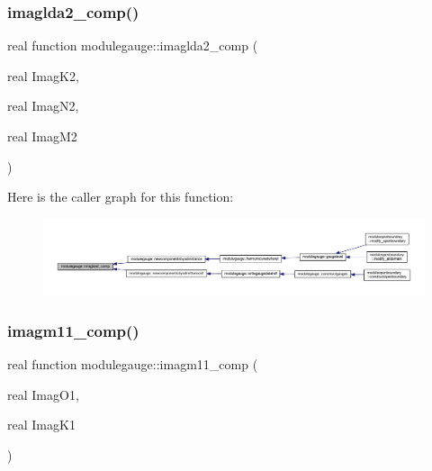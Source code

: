 \subsubsection{\texorpdfstring{imaglda2\+\_\+comp()}{imaglda2\_comp()}}
{\footnotesize\ttfamily real function modulegauge\+::imaglda2\+\_\+comp (\begin{DoxyParamCaption}\item[{real}]{Imag\+K2,  }\item[{real}]{Imag\+N2,  }\item[{real}]{Imag\+M2 }\end{DoxyParamCaption})\hspace{0.3cm}{\ttfamily [private]}}

Here is the caller graph for this function\+:\nopagebreak
\begin{figure}[H]
\begin{center}
\leavevmode
\includegraphics[width=350pt]{namespacemodulegauge_a0f06a83482f5b7e22cfbc40e9f7e89f4_icgraph}
\end{center}
\end{figure}
\mbox{\label{namespacemodulegauge_a7beaca7c4aa86b03edc166fe413a4f48}} 
\subsubsection{\texorpdfstring{imagm11\+\_\+comp()}{imagm11\_comp()}}
{\footnotesize\ttfamily real function modulegauge\+::imagm11\+\_\+comp (\begin{DoxyParamCaption}\item[{real}]{Imag\+O1,  }\item[{real}]{Imag\+K1 }\end{DoxyParamCaption})\hspace{0.3cm}{\ttfamily [private]}}

\mbox{\label{namespacemodulegauge_aa6945b552551befe5db497d61883c814}} 

